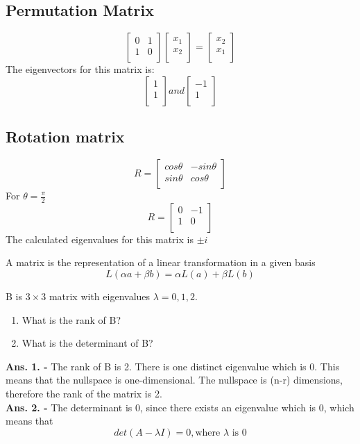 \documentclass[twoside]{report}
\begin{document}
\subsection{Permutation Matrix}
\[
	\begin{bmatrix}
	   0 & 1 \\
	   1 & 0 \\
	\end{bmatrix}
	\begin{bmatrix}
	x_1 \\
	x_2 \\
	\end{bmatrix}
	= 
\begin{bmatrix}
   x_2 \\ 
   x_1 \\
\end{bmatrix}
\]
The eigenvectors for this matrix is:
\[
	\begin{bmatrix}
	1 \\
	1 \\
	\end{bmatrix}
	and 
	\begin{bmatrix}
      -1 \\
      1 \\
	\end{bmatrix}
\]
\subsection{Rotation matrix}
\[
	R = 
	\begin{bmatrix}
		cos \theta & - sin \theta \\
		sin \theta & cos \theta \\
	\end{bmatrix}
\]
For $\theta= \frac{\pi}{2}$
\[
	R = 
	\begin{bmatrix}
		 0 & -1 \\
		 1 & 0 \\
	\end{bmatrix}
\]
The calculated eigenvalues for this matrix is $\pm i$
\begin{note}
	A matrix is the representation of a linear transformation in a given basis
	\[
		L(\alpha a + \beta b) = \alpha L(a) + \beta L(b)
	\]
\end{note}
\begin{question}
	B is $3 \times3$ matrix with eigenvalues $\lambda = 0,1,2$.
	 \begin{enumerate}
		\item What is the rank of B?
		\item What is the determinant of B?  
	\end{enumerate}
	\textbf{Ans. 1. - } The rank of B is 2. There is one distinct eigenvalue which is 0. This means that the nullspace is one-dimensional. The nullspace is (n-r) dimensions, therefore the rank of the matrix is 2. \\
	\textbf{Ans. 2. - } The determinant is 0, since there exists an eigenvalue which is 0, which means that 
	\[
	   det(A - \lambda I) = 0, \text{where } \lambda \text{ is 0}
	\]
\end{question}
\end{document}
